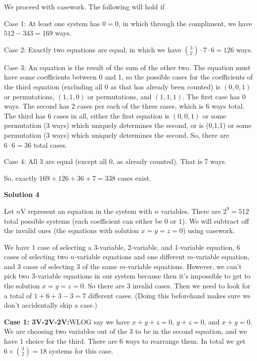 \begin{enumerate}
We proceed with casework. The following will hold if 

 Case 1: At least one system has $0=0$, in which through the compliment, we have $512-343 = 169$ ways.

 Case 2: Exactly two equations are equal, in which we have $\binom{3}{2} \cdot 7 \cdot 6 = 126$ ways.

 Case 3: An equation is the result of the sum of the other two. The equation must have some coefficients between 0 and 1, so the possible cases for the coefficients of the third equation (excluding all 0 as that has already been counted) is $(0,0,1)$ or permutations, $(1,1,0)$ or permutations, and $(1,1,1)$. The first case has 0 ways. The second has 2 cases per each of the three cases, which is 6 ways total. The third has 6 cases in all, either the first equation is $(0,0,1)$ or some permutation (3 ways) which uniquely determines the second, or is (0,1,1) or some permutation (3 ways) which uniquely determines the second. So, there are $6 \cdot 6 = 36$ total cases.

 Case 4: All 3 are equal (except all 0, as already counted). That is 7 ways.

 So, exactly $169+126+36+7= \boxed{338}$ cases exist.

 



\textbf{Solution 4}

Let $n$V represent an equation in the system with $n$ variables. There are $2^9 = 512$ total possible systems (each coefficient can either be $0$ or $1$). We will subtract off the invalid ones (the equations with solution $x = y = z = 0$) using casework.

 We have $1$ case of selecting a 3-variable, 2-variable, and 1-variable equation, $6$ cases of selecting two $n$-variable equations and one different $m$-variable equation, and $3$ cases of selecting 3 of the same $m$-variable equations. However, we can't pick two 3-variable equations in our system because then it's impossible to get to the solution $x = y = z = 0.$ So there are $3$ invalid cases. Then we need to look for a total of $1 + 6 + 3 - 3 = 7$ different cases. (Doing this beforehand makes sure we don’t accidentally skip a case.)

 \textbf{Case 1: 3V-2V-2V:}WLOG say we have $x + y + z = 0$, $y + z = 0$, and $x + y = 0$. We are choosing two variables out of the 3 to be in the second equation, and we have 1 choice for the third. There are 6 ways to rearrange them. In total we get $6 \times \binom{3}{2} = 18$ systems for this case.


\end{enumerate}
